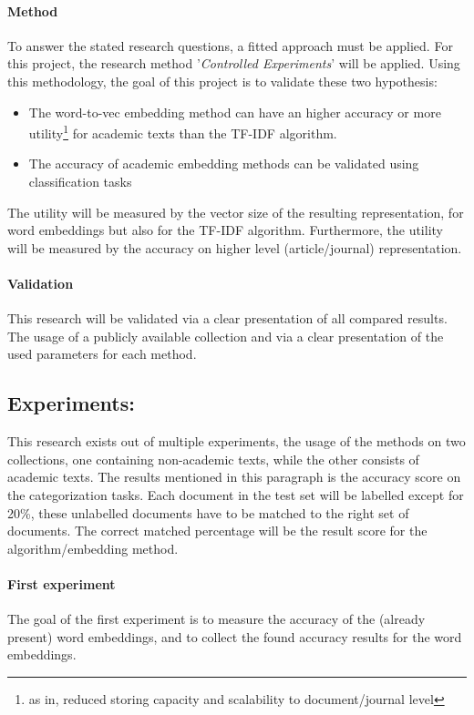 \documentclass[10pt,a4paper]{article}
\begin{document}
\paragraph{Method} To answer the stated research questions, a fitted approach must be applied. For this project, the research method '\textit{Controlled Experiments}' will be applied. Using this methodology, the goal of this project is to validate these two hypothesis:
\begin{itemize}
\item{The word-to-vec embedding method can have an higher accuracy or more utility\footnote{as in, reduced storing capacity and scalability to document/journal level} for academic texts than the TF-IDF algorithm.}
\item{The accuracy of academic embedding methods can be validated using classification tasks}
\end{itemize}
The utility will be measured by the vector size of the resulting representation, for word embeddings but also for the TF-IDF algorithm. Furthermore, the utility will be measured by the accuracy on higher level (article/journal) representation.

\paragraph{Validation} This research will be validated via a clear presentation of all compared results. The usage of a publicly available collection and via a clear presentation of the used parameters for each method.

\subsection{Experiments:}
This research exists out of multiple experiments, the usage of the methods on two collections, one containing non-academic texts, while the other consists of academic texts. The results mentioned in this paragraph is the accuracy score on the categorization tasks. Each document in the test set will be labelled except for 20\%, these unlabelled documents have to be matched to the right set of documents. The correct matched percentage will be the result score for the algorithm/embedding method.\\
\paragraph{First experiment}The goal of the first experiment is to measure the accuracy of the (already present) word embeddings, and to collect the found accuracy results for the word embeddings.
\end{document}
